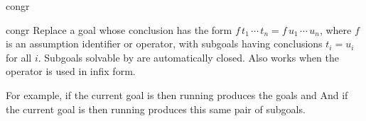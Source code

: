\begin{tactic}{congr}
  \begin{tsyntax}[empty]{congr}
    Replace a goal whose conclusion has the form
    $f\,t_1\,\cdots\,t_n = f\,u_1\,\cdots\,u_n$, where $f$ is an
    assumption identifier or operator, with subgoals having
    conclusions $t_i = u_i$ for all $i$.  Subgoals solvable by
     are automatically closed. Also works when the
    operator is used in infix form.

  For example, if the current goal is
   then
  running 
  produces the goals
  and
  And if the current goal is
   then
  running 
  produces this same pair of subgoals.
  \end{tsyntax}
\end{tactic}
